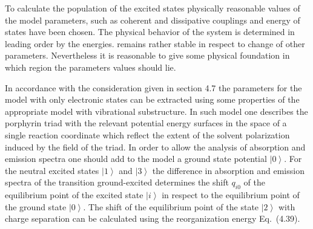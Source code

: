 \documentclass[12pt,twoside,a4paper]{report}
\begin{document}
  
To calculate the population of the excited states 
physically reasonable values of the
model parameters, such as 
coherent and dissipative couplings and energy of states have been chosen.
The physical behavior of the system is determined in leading order by the energies.
remains rather stable in respect to
change of other parameters.
Nevertheless it is reasonable to give some physical foundation
in which region the parameters values should lie.






In accordance with the consideration given in section 4.7
the parameters for the model with only electronic states can be extracted
using some properties of the appropriate model with
vibrational substructure.
In such model one describes the porphyrin triad with
the relevant potential energy surfaces
in the space of a single reaction coordinate 
which reflect the extent of the solvent polarization
induced by  the field of the triad.
In order to allow the analysis of absorption and emission spectra
one should add to the model a ground state potential $\left| 0 \right>$.  
For the neutral excited states $\left| 1 \right>$
and $\left| 3 \right>$
the difference in absorption and emission spectra
of the transition ground-excited
determines the shift $q_{i0}$ of the equilibrium point of the excited state $\left| i \right>$
 in respect to the equilibrium point of the
ground state $\left| 0 \right>$.
The shift of the equilibrium point of the state $\left| 2 \right>$
with charge separation can be calculated using the reorganization energy Eq.~(4.39).
\end{document}

